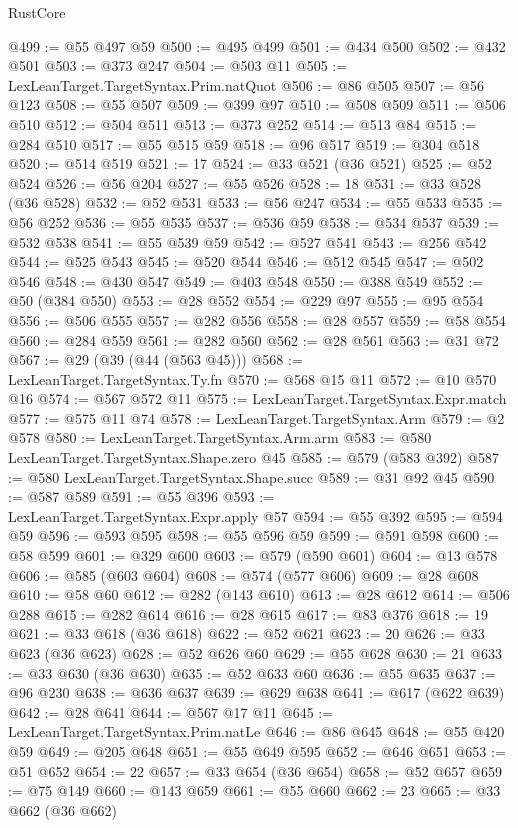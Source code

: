 \begin{lexlean}{RustCore}
\begin{coremodule}
@499 := @55 @497 @59
@500 := @495 @499
@501 := @434 @500
@502 := @432 @501
@503 := @373 @247
@504 := @503 @11
@505 := LexLeanTarget.TargetSyntax.Prim.natQuot
@506 := @86 @505
@507 := @56 @123
@508 := @55 @507
@509 := @399 @97
@510 := @508 @509
@511 := @506 @510
@512 := @504 @511
@513 := @373 @252
@514 := @513 @84
@515 := @284 @510
@517 := @55 @515 @59
@518 := @96 @517
@519 := @304 @518
@520 := @514 @519
@521 := 17
@524 := @33 @521 (@36 @521)
@525 := @52 @524
@526 := @56 @204
@527 := @55 @526
@528 := 18
@531 := @33 @528 (@36 @528)
@532 := @52 @531
@533 := @56 @247
@534 := @55 @533
@535 := @56 @252
@536 := @55 @535
@537 := @536 @59
@538 := @534 @537
@539 := @532 @538
@541 := @55 @539 @59
@542 := @527 @541
@543 := @256 @542
@544 := @525 @543
@545 := @520 @544
@546 := @512 @545
@547 := @502 @546
@548 := @430 @547
@549 := @403 @548
@550 := @388 @549
@552 := @50 (@384 @550)
@553 := @28 @552
@554 := @229 @97
@555 := @95 @554
@556 := @506 @555
@557 := @282 @556
@558 := @28 @557
@559 := @58 @554
@560 := @284 @559
@561 := @282 @560
@562 := @28 @561
@563 := @31 @72
@567 := @29 (@39 (@44 (@563 @45)))
@568 := LexLeanTarget.TargetSyntax.Ty.fn
@570 := @568 @15 @11
@572 := @10 @570 @16
@574 := @567 @572 @11
@575 := LexLeanTarget.TargetSyntax.Expr.match
@577 := @575 @11 @74
@578 := LexLeanTarget.TargetSyntax.Arm
@579 := @2 @578
@580 := LexLeanTarget.TargetSyntax.Arm.arm
@583 := @580 LexLeanTarget.TargetSyntax.Shape.zero @45
@585 := @579 (@583 @392)
@587 := @580 LexLeanTarget.TargetSyntax.Shape.succ
@589 := @31 @92 @45
@590 := @587 @589
@591 := @55 @396
@593 := LexLeanTarget.TargetSyntax.Expr.apply @57
@594 := @55 @392
@595 := @594 @59
@596 := @593 @595
@598 := @55 @596 @59
@599 := @591 @598
@600 := @58 @599
@601 := @329 @600
@603 := @579 (@590 @601)
@604 := @13 @578
@606 := @585 (@603 @604)
@608 := @574 (@577 @606)
@609 := @28 @608
@610 := @58 @60
@612 := @282 (@143 @610)
@613 := @28 @612
@614 := @506 @288
@615 := @282 @614
@616 := @28 @615
@617 := @83 @376
@618 := 19
@621 := @33 @618 (@36 @618)
@622 := @52 @621
@623 := 20
@626 := @33 @623 (@36 @623)
@628 := @52 @626 @60
@629 := @55 @628
@630 := 21
@633 := @33 @630 (@36 @630)
@635 := @52 @633 @60
@636 := @55 @635
@637 := @96 @230
@638 := @636 @637
@639 := @629 @638
@641 := @617 (@622 @639)
@642 := @28 @641
@644 := @567 @17 @11
@645 := LexLeanTarget.TargetSyntax.Prim.natLe
@646 := @86 @645
@648 := @55 @420 @59
@649 := @205 @648
@651 := @55 @649 @595
@652 := @646 @651
@653 := @51 @652
@654 := 22
@657 := @33 @654 (@36 @654)
@658 := @52 @657
@659 := @75 @149
@660 := @143 @659
@661 := @55 @660
@662 := 23
@665 := @33 @662 (@36 @662)

\end{coremodule}
\end{lexlean}
